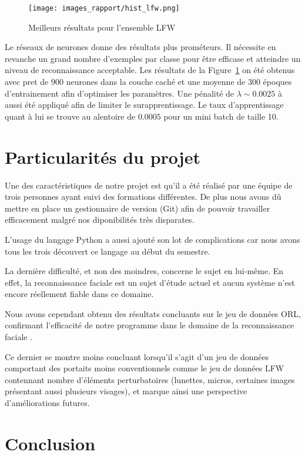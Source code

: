 \documentclass[a4paper,10pt,twocolumn]{extarticle}
\begin{document}
\begin{figure}[H]
  \begin{center}
    \texttt{[image: images\_rapport/hist\_lfw.png]}
    \caption{Meilleurs résultats pour l'ensemble LFW}
    \label{fig:results_lfw}
  \end{center}
\end{figure}
Le réseaux de neurones donne des résultats plus prométeurs. Il nécessite en revanche un grand nombre d'exemples par classe pour être efficase et atteindre un niveau de reconnaissance acceptable. Les résultats de la Figure~\ref{fig:results_lfw} on été obtenus avec pret de $900$ neurones dans la couche caché et une moyenne de $300$ époques d'entrainement afin d'optimiser les paramètres. Une pénalité de $\lambda \sim 0.0025$ à aussi été appliqué afin de limiter le surapprentissage. Le taux d'apprentissage quant à lui se trouve au alentoire de $0.0005$ pour un mini batch de taille 10.

\section{Particularités du projet}
Une des caractéristiques de notre projet est qu'il a été réalisé par une équipe de trois personnes ayant suivi des formations différentes. De plus nous avons dû mettre en place un gestionnaire de version (Git) afin de pouvoir travailler efficacement malgré nos diponibilités très disparates.

L'usage du langage Python a aussi ajouté son lot de complications car nous avons tous les trois découvert ce langage au début du semestre.

La dernière difficulté, et non des moindres, concerne le sujet en lui-même. En effet, la reconnaissance faciale est un sujet d'étude actuel et aucun système n'est encore réellement fiable dans ce domaine.

Nous avons cependant obtenu des résultats concluants sur le jeu de données ORL, confirmant l'efficacité de notre programme dans le domaine de la reconnaissance faciale .

Ce dernier se montre moins concluant lorsqu'il s'agit d'un jeu de données comportant des portaits moins conventionnels comme le jeu de données LFW contennant nombre d'éléments perturbatoires (lunettes, micros, certaines images présentant aussi plusieurs visages), et marque ainsi une perspective d'améliorations futures.


\section{Conclusion}
\end{document}
